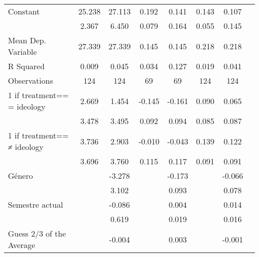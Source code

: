 \begin{table}[H]
{\begin{threeparttable}
\begin{tabular}{lccccccc}
Constant            &      25.238\sym{***}&      27.113\sym{***}&       0.192\sym{**} &       0.141         &       0.143\sym{**} &       0.107         \\
                    &       2.367         &       6.450         &       0.079         &       0.164         &       0.055         &       0.145         \\
Mean Dep. Variable  &      27.339         &      27.339         &       0.145         &       0.145         &       0.218         &       0.218         \\
R Squared           &       0.009         &       0.045         &       0.034         &       0.127         &       0.019         &       0.041         \\
Observations        &         124         &         124         &          69         &          69         &         124         &         124         \\
\midrule
1 if treatment== = ideology&       2.669         &       1.454         &      -0.145         &      -0.161\sym{*}  &       0.090         &       0.065         \\
                    &       3.478         &       3.495         &       0.092         &       0.094         &       0.085         &       0.087         \\
1 if treatment== ≠ ideology&       3.736         &       2.903         &      -0.010         &      -0.043         &       0.139         &       0.122         \\
                    &       3.696         &       3.760         &       0.115         &       0.117         &       0.091         &       0.091         \\
Género             &                     &      -3.278         &                     &      -0.173\sym{*}  &                     &      -0.066         \\
                    &                     &       3.102         &                     &       0.093         &                     &       0.078         \\
Semestre actual     &                     &      -0.086         &                     &       0.004         &                     &       0.014         \\
                    &                     &       0.619         &                     &       0.019         &                     &       0.016         \\
Guess 2/3 of the Average&                     &      -0.004         &                     &       0.003         &                     &      -0.001         \\

\end{tabular}
\end{threeparttable}}
\end{table}
